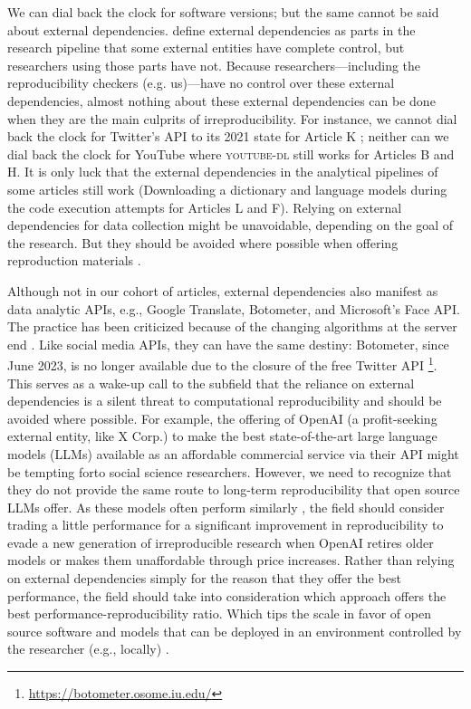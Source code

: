 We can dial back the clock for software versions; but the same cannot be said about external dependencies. \textcite{schoch:2023:CRC} define external dependencies as parts in the research pipeline that some external entities have complete control, but researchers using those parts have not. Because researchers---including the reproducibility checkers (e.g. us)---have no control over these external dependencies, almost nothing about these external dependencies can be done when they are the main culprits of irreproducibility. For instance, we cannot dial back the clock for Twitter's API to its 2021 state for Article K \parencite[see][]{assenmacher:2023:ERE}; neither can we dial back the clock for YouTube where \textsc{youtube-dl} still works for Articles B and H. It is only luck that the external dependencies in the analytical pipelines of some articles still work (Downloading a dictionary and language models during the code execution attempts for Articles L and F). Relying on external dependencies for data collection might be unavoidable, depending on the goal of the research. But they should be avoided where possible when offering reproduction materials \parencite[e.g.,][]{nonconsumptive,schoch:2023:CRC}.

Although not in our cohort of articles, external dependencies also manifest as data analytic APIs, e.g., Google Translate, Botometer, and  Microsoft's Face API. The practice has been criticized because of the changing algorithms at the server end \parencite[]{chan:2020:REC,rauchfleisch:2020:F,chen2023chatgpt}. Like social media APIs, they can have the same destiny: Botometer, since June 2023, is no longer available due to the closure of the free Twitter API \footnote{\url{https://botometer.osome.iu.edu/}}. This serves as a wake-up call to the subfield that the reliance on external dependencies is a silent threat to computational reproducibility \parencite[]{schoch:2023:CRC,davidson2023social} and should be avoided where possible. For example, the offering of OpenAI (a profit-seeking external entity, like X Corp.) to make the best state-of-the-art large language models (LLMs) available as an affordable commercial service via their API might be tempting forto social science researchers. However, we need to recognize that they do not provide the same route to long-term reproducibility that open source LLMs offer. As these models often perform similarly \parencite[]{weber:2024:E}, the field should consider trading a little performance for a significant improvement in reproducibility to evade a new generation of irreproducible research when OpenAI retires older models or makes them unaffordable through price increases. Rather than relying on external dependencies simply for the reason that they offer the best performance, the field should take into consideration which approach offers the best performance-reproducibility ratio. Which tips the scale in favor of open source software and models that can be deployed in an environment controlled by the researcher (e.g., locally) \parencite[]{schoch:2023:CRC}.


